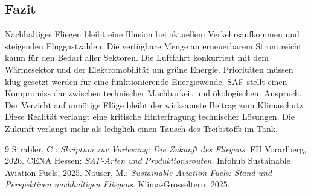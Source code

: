 \documentclass[12pt,a4paper]{article}
\begin{document}
\subsection{Fazit}
Nachhaltiges Fliegen bleibt eine Illusion bei aktuellem Verkehrsaufkommen und steigenden Fluggastzahlen. Die verfügbare Menge an erneuerbarem Strom reicht kaum für den Bedarf aller Sektoren. Die Luftfahrt konkurriert mit dem Wärmesektor und der Elektromobilität um grüne Energie. Prioritäten müssen klug gesetzt werden für eine funktionierende Energiewende. SAF stellt einen Kompromiss dar zwischen technischer Machbarkeit und ökologischem Anspruch. Der Verzicht auf unnötige Flüge bleibt der wirksamste Beitrag zum Klimaschutz. Diese Realität verlangt eine kritische Hinterfragung technischer Lösungen. Die Zukunft verlangt mehr als lediglich einen Tausch des Treibstoffs im Tank.

\newpage
\begin{thebibliography}{9}
  Strabler, C.: \textit{Skriptum zur Vorlesung: Die Zukunft des Fliegens}. FH Vorarlberg, 2026.
  CENA Hessen: \textit{SAF-Arten und Produktionsrouten}. Infohub Sustainable Aviation Fuels, 2025.
  Nauser, M.: \textit{Sustainable Aviation Fuels: Stand und Perspektiven nachhaltigen Fliegens}. Klima-Grosseltern, 2025.
\end{thebibliography}
\end{document}
